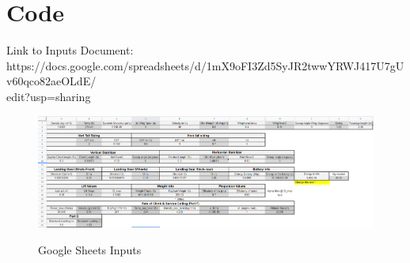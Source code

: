 \documentclass[12pt,A4paper]{article}
\begin{document}
	\section{Code}
	\begin{center}
	Link to Inputs Document: https://docs.google.com/spreadsheets/d/1mX9oFI3Zd5SyJR2twwYRWJ417U7gUv60qco82aeOLdE/\\edit?usp=sharing \\
	\begin{figure}[!h]
		\centering
		\includegraphics[width=1\textwidth]{Inputs.PNG} \label{fig:f15}
		\caption{Google Sheets Inputs}
	\end{figure}
	\end{center}
\end{document}
